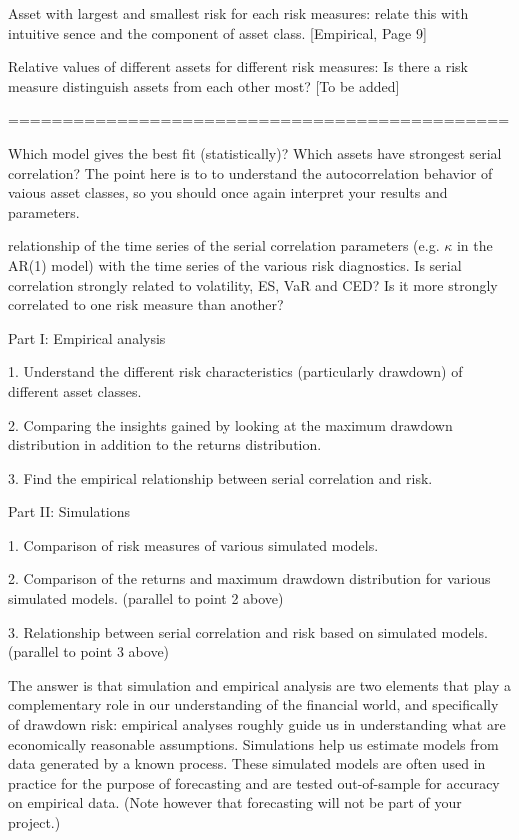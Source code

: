 \documentclass[11pt]{article}
\begin{document}
Asset with largest and smallest risk for each risk measures: relate this with intuitive sence and the component of asset class. [Empirical, Page 9]

Relative values of different assets for different risk measures: Is there a risk measure distinguish assets from each other most? [To be added]

==============================================


Which model gives the best fit (statistically)? Which assets have strongest serial correlation? The point here is to to understand the autocorrelation behavior of vaious asset classes, so you should once again interpret your results and parameters.


relationship of the time series of the serial correlation parameters (e.g. $\kappa$ in the AR(1) model) with the time series of the various risk diagnostics. Is serial correlation strongly related to volatility, ES, VaR and CED? Is it more strongly correlated to one risk measure than another?



Part I: Empirical analysis

1. Understand the different risk characteristics (particularly drawdown) of different asset classes.

2. Comparing the insights gained by looking at the maximum drawdown distribution in addition to the returns distribution.

3. Find the empirical relationship between serial correlation and risk.


Part II: Simulations

1. Comparison of risk measures of various simulated models.

2. Comparison of the returns and maximum drawdown distribution for various simulated models. (parallel to point 2 above)

3. Relationship between serial correlation and risk based on simulated models. (parallel to point 3 above)


The answer is that simulation and empirical analysis are two elements that play a complementary role in our understanding of the financial world, and specifically of drawdown risk: empirical analyses roughly guide us in understanding what are economically reasonable assumptions. Simulations help us estimate models from data generated by a known process. These simulated models are often used in practice for the purpose of forecasting and are tested out-of-sample for accuracy on empirical data. (Note however that forecasting will not be part of your project.)
\end{document}
